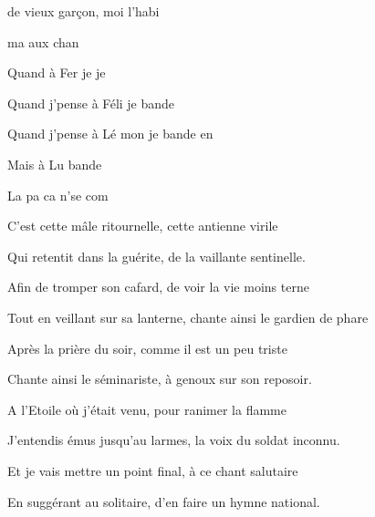 

\zs
{} de vieux garçon,
moi  l'habi

 ma
aux   chan 
\ks

\zr 
Quand  à Fer
je  je 

Quand j'pense à Féli
je bande 

Quand j'pense à Lé
mon  je bande en

Mais  à Lu
  bande 

La  pa
ca n'se com ~~~ 
\kr

\zs
C'est cette mâle ritournelle,
cette antienne virile 

Qui retentit dans la guérite,
de la vaillante sentinelle.
\ks

\zr \kr

\zs
Afin de tromper son cafard,
de voir la vie moins terne 

Tout en veillant sur sa lanterne,
chante ainsi le gardien de phare
\ks

\zr \kr

\zs
Après la prière du soir,
comme il est un peu triste 

Chante ainsi le séminariste,
à genoux sur son reposoir.
\ks

\zr \kr

\zs
A l'Etoile où j'était venu,
pour ranimer la flamme 

J'entendis émus jusqu'au larmes,
la voix du soldat inconnu.
\ks

\zr \kr

\zs
Et je vais mettre un point final,
à ce chant salutaire 

En suggérant au solitaire,
d'en faire un hymne national.
\ks

\zr \kr

\kp
